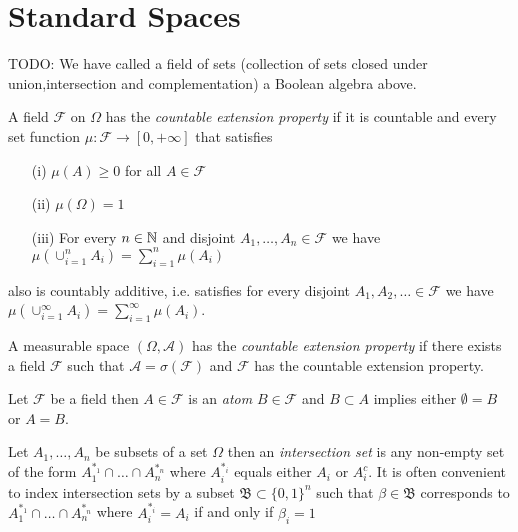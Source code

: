 \section{Standard Spaces}

TODO: We have called a field of sets (collection of sets closed under union,intersection and complementation) a Boolean algebra above.

\begin{defn}A field $\mathcal{F}$ on $\Omega$ has the \emph{countable extension property} if it is countable and 
every set function $\mu : \mathcal{F} \to [0, +\infty]$ that satisfies 
\begin{itemize}
\item[(i)] $\mu(A) \geq 0$ for all $A \in \mathcal{F}$
\item[(ii)] $\mu(\Omega) = 1$
\item[(iii)] For every $n \in \mathbb{N}$ and disjoint $A_1, \dotsc, A_n \in \mathcal{F}$ we have $\mu(\cup_{i=1}^n A_i) =  \sum_{i=1}^n \mu(A_i)$
\end{itemize}
also is countably additive, i.e. satisfies  for every disjoint $A_1, A_2, \dotsc\in \mathcal{F}$ we have $\mu(\cup_{i=1}^\infty A_i) =  \sum_{i=1}^\infty \mu(A_i)$.
\end{defn} 

\begin{defn}A measurable space $(\Omega, \mathcal{A})$ has the \emph{countable extension property} if there exists a field $\mathcal{F}$ such that $\mathcal{A} = \sigma(\mathcal{F})$ 
and $\mathcal{F}$ has the countable extension property.
\end{defn}

\begin{defn}Let $\mathcal{F}$ be a field then $A \in \mathcal{F}$ is an \emph{atom}  $B \in \mathcal{F}$ and $B \subset A$ implies either $\emptyset = B$ or $A = B$.
\end{defn}

\begin{defn}Let $A_1, \dotsc, A_n$ be subsets of a set $\Omega$ then an \emph{intersection set} is any non-empty set of the form $A_1^{*_1} \cap \dotsc \cap A_n^{*_n}$ where $A_i^{*_i}$ equals either $A_i$ or $A_i^c$.  It is often convenient to index intersection sets by a subset $\mathfrak{B} \subset \lbrace 0, 1 \rbrace^n$ such that $\beta \in \mathfrak{B}$ corresponds to $A_1^{*_1} \cap \dotsc \cap A_n^{*_n}$ where $A_i^{*_i} = A_i$ if and only if $\beta_i=1$
\end{defn}

